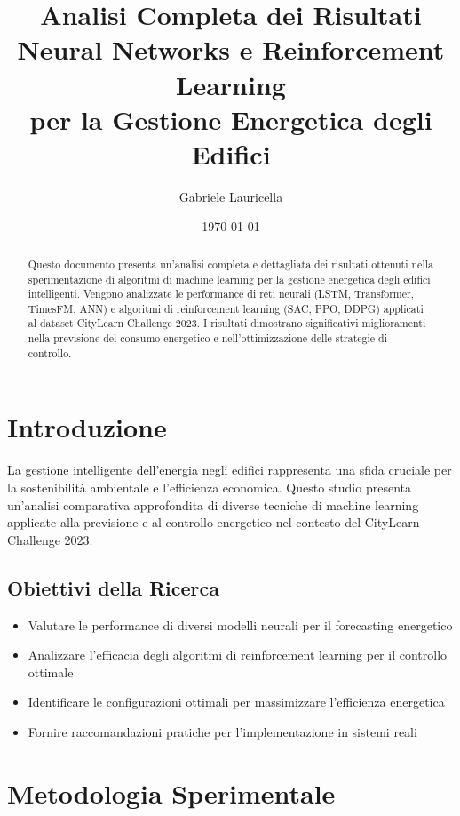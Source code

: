 \documentclass[11pt,a4paper]{article}
\title{\textbf{\Large Analisi Completa dei Risultati\\
\large Neural Networks e Reinforcement Learning\\
per la Gestione Energetica degli Edifici}}
\author{Gabriele Lauricella}
\date{\today}
\begin{document}
\maketitle

\begin{abstract}
Questo documento presenta un'analisi completa e dettagliata dei risultati ottenuti nella sperimentazione di algoritmi di machine learning per la gestione energetica degli edifici intelligenti. Vengono analizzate le performance di reti neurali (LSTM, Transformer, TimesFM, ANN) e algoritmi di reinforcement learning (SAC, PPO, DDPG) applicati al dataset CityLearn Challenge 2023. I risultati dimostrano significativi miglioramenti nella previsione del consumo energetico e nell'ottimizzazione delle strategie di controllo.
\end{abstract}

\tableofcontents
\newpage

\section{Introduzione}

La gestione intelligente dell'energia negli edifici rappresenta una sfida cruciale per la sostenibilità ambientale e l'efficienza economica. Questo studio presenta un'analisi comparativa approfondita di diverse tecniche di machine learning applicate alla previsione e al controllo energetico nel contesto del CityLearn Challenge 2023.

\subsection{Obiettivi della Ricerca}
\begin{itemize}
    \item Valutare le performance di diversi modelli neurali per il forecasting energetico
    \item Analizzare l'efficacia degli algoritmi di reinforcement learning per il controllo ottimale
    \item Identificare le configurazioni ottimali per massimizzare l'efficienza energetica
    \item Fornire raccomandazioni pratiche per l'implementazione in sistemi reali
\end{itemize}

\section{Metodologia Sperimentale}
\end{document}
